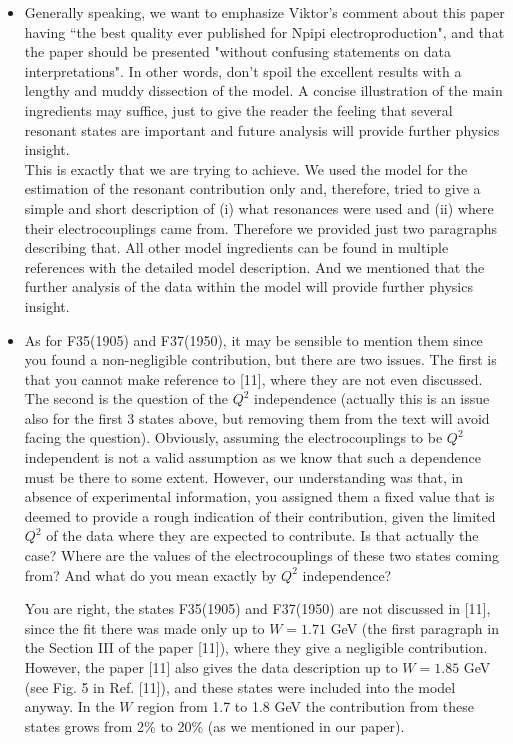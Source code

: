 \documentclass[superscriptaddress,showpacs,amssymb,amsmath,amsfonts,linenumbers,article]{revtex4-1}
\begin{document}
\begin{itemize}

\item {\color{red} Generally speaking, we want to emphasize Viktor's comment about this paper having ``the best quality ever published for Npipi electroproduction", and that the paper should be presented "without confusing statements on data interpretations". In other words,  don't spoil the excellent results with a lengthy and muddy dissection of the model. A concise illustration of the main ingredients may suffice, just to give the reader the feeling that several resonant states are important and future analysis will provide further physics insight.}\\
{\color{blue} This is exactly that we are trying to achieve. We used the model for the estimation of the resonant contribution only and, therefore, tried to give a simple and short description of (i) what resonances were used and (ii) where their electrocouplings came from. Therefore we provided just two paragraphs describing that. All other model ingredients can be found in multiple references with the detailed model description. And we mentioned that the further analysis of the data within the model will provide further physics insight.}


\item {\color{red} As for F35(1905) and F37(1950), it may be sensible to mention them since you found a non-negligible contribution, but there are two issues. The first is that you cannot make reference to [11], where they are not even discussed. The second is the question of the $Q^2$ independence (actually this is an issue also for the first 3 states above, but removing them from the text will avoid facing the question). Obviously, assuming the electrocouplings to be $Q^2$ independent is not a valid assumption as we know that such a dependence must be there to some extent. However, our understanding was that, in absence of experimental information, you assigned them a fixed value that is deemed to provide a rough indication of their contribution, given the limited $Q^2$ of the data where they are expected to contribute. Is that actually the case? Where are the values of the electrocouplings of these two states coming from? And what do you mean exactly by $Q^2$ independence? }\\
{\color{blue} You are right, the states F35(1905) and F37(1950) are not discussed in [11], since the fit there was made only up to $W = 1.71$ GeV (the first paragraph in the Section III of the paper [11]), where they give a negligible contribution. However, the paper [11] also gives the data description up to $W = 1.85$ GeV (see Fig. 5 in Ref. [11]), and these states were included into the model anyway. In the $W$ region from 1.7 to 1.8 GeV the contribution from these states grows from 2\% to 20\% (as we mentioned in our paper).

}
\end{itemize}
\end{document}
